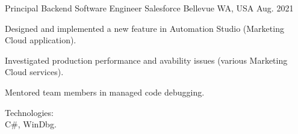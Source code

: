 
\begin{cventries}

\cventry
{Principal Backend Software Engineer} %
{Salesforce} %
{Bellevue WA, USA} %
{Aug. 2021 } %
{
  \begin{cvitems} %
    \item
    {
      Designed and implemented a new feature in Automation Studio (Marketing Cloud application).
    }
    \item
    {
      Investigated production performance and avability issues (various Marketing Cloud services).
    }
    \item
    {
      Mentored team members in managed code debugging.
    }
    \item
    {
      Technologies:\\
      {C\#}, WinDbg.
    }
  \end{cvitems}
}



\end{cventries}
